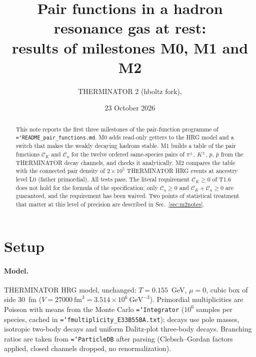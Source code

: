 \documentclass[11pt,a4paper]{article}
\title{Pair functions in a hadron resonance gas at rest:\\ results of milestones M0, M1 and M2}
\author{THERMINATOR 2 (hboltz fork), \code{src/work/README\_pair\_functions.md}}
\date{23 October 2026}
\newcommand{\CK}{\mathcal C_K}
\newcommand{\Cu}{\mathcal C_u}
\newcommand{\code}[1]{\texttt{\hyphenchar\font=`\-#1}}
\begin{document}
\maketitle

\begin{abstract}
\noindent
This note reports the first three milestones of the pair-function programme of
\code{README\_pair\_functions.md}. M0 adds read-only getters to the HRG model and a switch that
makes the weakly decaying hadrons stable. M1 builds a table of the pair functions $\CK$ and $\Cu$
for the twelve ordered same-species pairs of $\pi^\pm$, $K^\pm$, $p$, $\bar p$ from the
THERMINATOR decay channels, and checks it analytically. M2 compares the table with the connected
pair density of $2\times10^5$ THERMINATOR HRG events at ancestry level L0 (father primordial).
All tests pass. The literal requirement $\CK\ge0$ of T1.6 does not hold for the formula of the
specification; only $\Cu\ge0$ and $\CK+\Cu\ge0$ are guaranteed, and the requirement has been
waived. Two points of statistical treatment that matter at this level of precision are described
in Sec.~\ref{sec:m2notes}.
\end{abstract}

\section{Setup}

\paragraph{Model.} THERMINATOR HRG model, unchanged: $T=0.155$~GeV, $\mu=0$, cubic box of side
30~fm ($V=27000~\text{fm}^3=3.514\times10^{6}~\text{GeV}^{-3}$). Primordial multiplicities are
Poisson with means from the Monte Carlo \code{Integrator} ($10^6$ samples per species, cached in
\code{fmultiplicity\_E33B55BA.txt}); decays use pole masses, isotropic two-body decays and
uniform Dalitz-plot three-body decays. Branching ratios are taken from \code{ParticleDB} after
parsing (Clebsch--Gordan factors applied, closed channels dropped, no renormalization).
\end{document}
